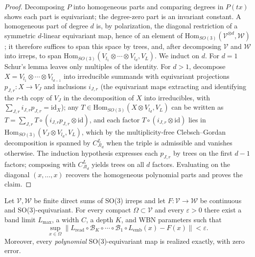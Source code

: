 \begin{proof}
    Decomposing $P$ into homogeneous parts and comparing degrees in $P(tx)$ shows each part is equivariant; the degree-zero part is an invariant constant.
    A homogeneous part of degree $d$ is, by polarization, the diagonal restriction of a symmetric $d$-linear equivariant map, hence of an element of $\mathrm{Hom}_{SO(3)}(\mathcal{V}^{\otimes d},\mathcal{W})$; it therefore suffices to span this space by trees, and, after decomposing $\mathcal{V}$ and $\mathcal{W}$ into irreps, to span $\mathrm{Hom}_{SO(3)}(V_{l_1}\otimes\cdots\otimes V_{l_d},V_L)$.
    We induct on $d$.
    For $d=1$ Schur's lemma leaves only multiples of the identity.
    For $d>1$, decompose $X=V_{l_1}\otimes\cdots\otimes V_{l_{d-1}}$ into irreducible summands with equivariant projections $p_{J,r}:X\to V_J$ and inclusions $i_{J,r}$ (the equivariant maps extracting and identifying the $r$-th copy of $V_J$ in the decomposition of $X$ into irreducibles, with $\sum_{J,r}i_{J,r}p_{J,r}=\mathrm{id}_X$); any $T\in\mathrm{Hom}_{SO(3)}(X\otimes V_{l_d},V_L)$ can be written as $T=\sum_{J,r}T\circ(i_{J,r}p_{J,r}\otimes\mathrm{id})$, and each factor $T\circ(i_{J,r}\otimes\mathrm{id})$ lies in $\mathrm{Hom}_{SO(3)}(V_J\otimes V_{l_d},V_L)$, which by the multiplicity-free Clebsch--Gordan decomposition is spanned by $C^{L}_{Jl_d}$ when the triple is admissible and vanishes otherwise.
    The induction hypothesis expresses each $p_{J,r}$ by trees on the first $d-1$ factors; composing with $C^{L}_{Jl_d}$ yields trees on all $d$ factors.
    Evaluating on the diagonal $(x,\ldots,x)$ recovers the homogeneous polynomial parts and proves the claim.
\end{proof}

\begin{theorem}
    \label{thm:sm-wbn-complete}
    Let $\mathcal{V},\mathcal{W}$ be finite direct sums of SO(3) irreps and let $F:\mathcal{V}\to\mathcal{W}$ be continuous and SO(3)-equivariant.
    For every compact $\Omega\subset\mathcal{V}$ and every $\varepsilon>0$ there exist a band limit $L_{\max}$, a width $C$, a depth $K$, and WBN parameters such that
    \begin{equation}
        \sup_{x\in\Omega}
        \bigl\|L_{\mathrm{read}}\circ\mathcal{B}_{K}\circ\cdots\circ\mathcal{B}_{1}\circ L_{\mathrm{emb}}(x)-F(x)\bigr\|
        <\varepsilon .
        \label{eq:sm-wbn-uat}
    \end{equation}
    Moreover, every \emph{polynomial} SO(3)-equivariant map is realized exactly, with zero error.
\end{theorem}


